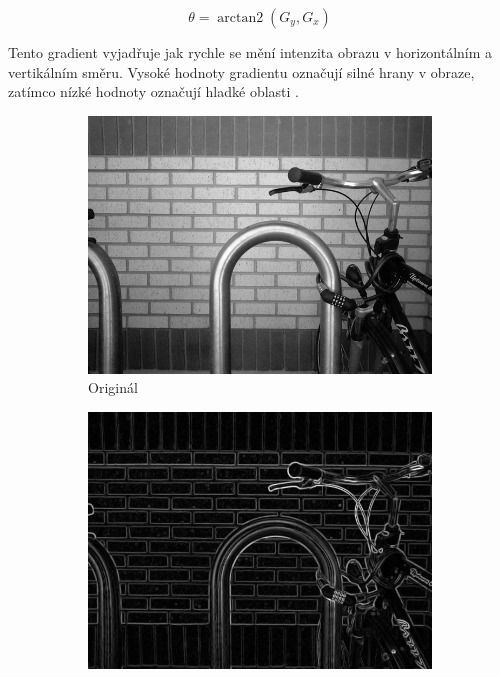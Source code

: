 \begin{equation}\label{orientation_scharr}
\theta = \operatorname{arctan2}(G_y, G_x)
\end{equation}



Tento gradient vyjadřuje jak rychle se mění intenzita obrazu v horizontálním a vertikálním směru. Vysoké hodnoty gradientu označují silné hrany v obraze, zatímco nízké hodnoty označují hladké oblasti \cite{scharr}.

\begin{figure}[h]\centering
    \centering
    \begin{subfigure}{0.3\textwidth}
    \includegraphics[width=0.9\linewidth]{obrazky-figures/edge_original.png}\hfill
    \caption{Originál}
    \end{subfigure}
    \begin{subfigure}{0.3\textwidth}
    \includegraphics[width=0.9\linewidth]{obrazky-figures/edge_sobel.png}\hfill

\end{subfigure}
\end{figure}
